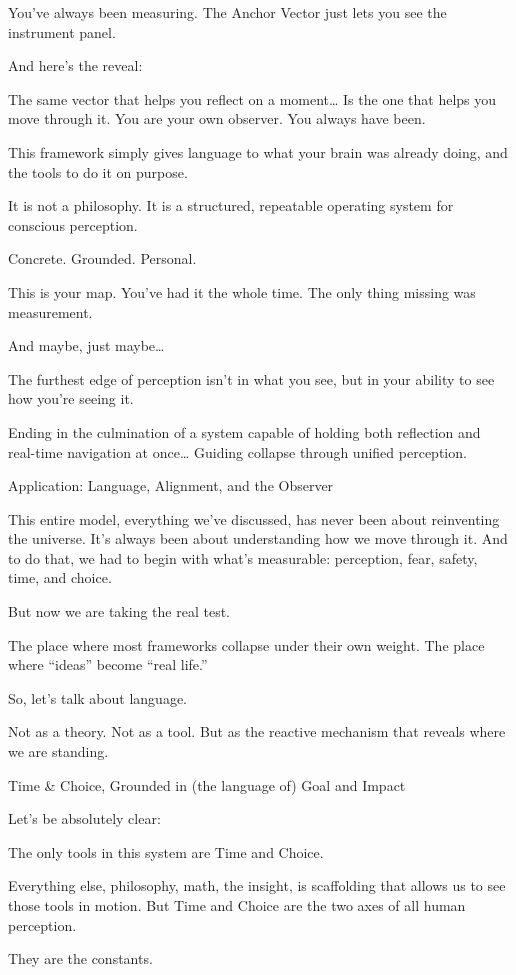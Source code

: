 \documentclass[11pt]{article}
\begin{document}
You’ve always been measuring.
The Anchor Vector just lets you see the instrument panel.

And here’s the reveal:

The same vector that helps you reflect on a moment…
Is the one that helps you move through it.
You are your own observer.
You always have been.

This framework simply gives language to what your brain was already doing, and the tools to do it on purpose.

It is not a philosophy.
It is a structured, repeatable operating system for conscious perception.

Concrete. Grounded. Personal.

This is your map.
You’ve had it the whole time.
The only thing missing was measurement.

And maybe, just maybe…

The furthest edge of perception isn’t in what you see,
but in your ability to see how you’re seeing it.

Ending in the culmination of a system capable of holding both reflection and real-time navigation at once…
Guiding collapse through unified perception.

Application: Language, Alignment, and the Observer

This entire model, everything we’ve discussed, has never been about reinventing the universe. It’s always been about understanding how we move through it. And to do that, we had to begin with what’s measurable: perception, fear, safety, time, and choice.

But now we are taking the real test.

The place where most frameworks collapse under their own weight.
The place where “ideas” become “real life.”

So, let’s talk about language.

Not as a theory.
Not as a tool.
But as the reactive mechanism that reveals where we are standing.

Time & Choice, Grounded in (the language of) Goal and Impact

Let’s be absolutely clear:

The only tools in this system are Time and Choice.

Everything else, philosophy, math, the insight, is scaffolding that allows us to see those tools in motion. But Time and Choice are the two axes of all human perception.

They are the constants.
\end{document}
